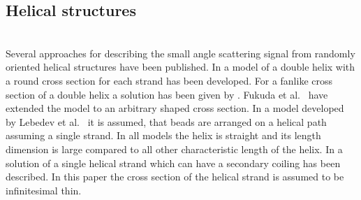 


\clearpage
\subsection{Helical structures} ~\\
Several approaches for describing the small angle scattering signal from randomly oriented helical structures have been published.
In \cite{Franklin1956,Puigjaner1974} a model of a double helix with a round cross section for each strand has been developed. For a fanlike cross section of a double helix a solution has been given by \cite{Schmidt1970,Pringle1971}. Fukuda et al.\ \cite{Fukuda2002} have extended the model to an arbitrary shaped cross section. In a model developed by Lebedev et al.\ \cite{Lebedev2003} it is assumed, that beads are arranged on a helical path assuming a single strand. In all models the helix is straight and its length dimension is large compared to all other characteristic length of the helix.
In \cite{Benham1980} a solution of a single helical strand which can have a secondary coiling has been described. In this paper the cross section of the helical strand is assumed to be infinitesimal thin.

~\\
